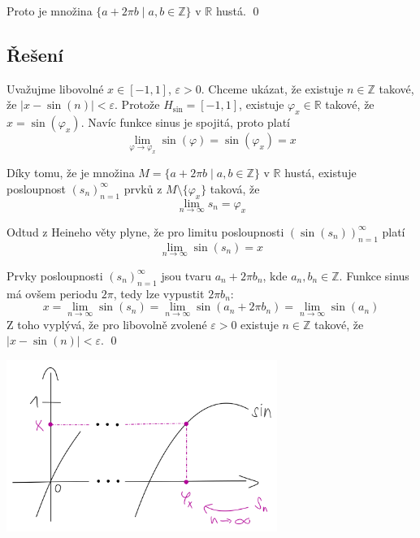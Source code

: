 \documentclass[a4paper]{article}
\begin{document}
Proto je množina $\{a + 2\pi b \mid a, b \in \mathbb{Z}\}$ v $\mathbb{R}$ hustá.
\qed

\subsection*{Řešení}

Uvažujme libovolné $x \in [-1, 1]$, $\varepsilon > 0$. Chceme ukázat, že existuje $n \in \mathbb{Z}$ takové, že $|x - \sin(n)| < \varepsilon$. Protože $H_{\sin} = [-1, 1]$, existuje $\varphi_x \in \mathbb{R}$ takové, že $x = \sin(\varphi_x)$. Navíc funkce sinus je spojitá, proto platí
\[ \lim_{\varphi \to \varphi_x} \sin(\varphi) = \sin(\varphi_x) = x \]

Díky tomu, že je množina $M = \{a + 2\pi b \mid a, b \in \mathbb{Z}\}$ v $\mathbb{R}$ hustá, existuje posloupnost $(s_n)^{\infty}_{n = 1}$ prvků z $M \setminus \{\varphi_x\}$ taková, že
\[\lim_{n \to \infty} s_n = \varphi_x \]

Odtud z Heineho věty plyne, že pro limitu posloupnosti $(\sin(s_n))^{\infty}_{n = 1}$ platí
\[\lim_{n \to \infty} \sin(s_n) = x \]

Prvky posloupnosti $(s_n)^{\infty}_{n = 1}$ jsou tvaru $a_n + 2\pi b_n$, kde $a_n, b_n \in \mathbb{Z}$. Funkce sinus má ovšem periodu $2\pi$, tedy lze vypustit $2\pi b_n$:
\[
    x = \lim_{n \to \infty} \sin(s_n)
    = \lim_{n \to \infty} \sin(a_n + 2\pi b_n)
    = \lim_{n \to \infty} \sin(a_n)
\]
Z toho vyplývá, že pro libovolně zvolené $\varepsilon > 0$ existuje  $n \in \mathbb{Z}$ takové, že ${|x - \sin(n)| < \varepsilon}$.
\qed

\begin{center}
    \includegraphics[height=5.6cm]{4}
\end{center}
\end{document}

